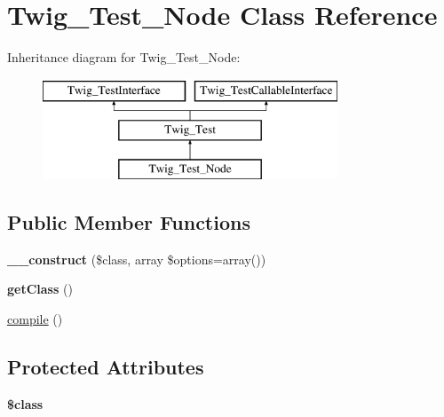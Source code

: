 \hypertarget{class_twig___test___node}{}\section{Twig\+\_\+\+Test\+\_\+\+Node Class Reference}
\label{class_twig___test___node}
Inheritance diagram for Twig\+\_\+\+Test\+\_\+\+Node\+:\begin{figure}[H]
\begin{center}
\leavevmode
\includegraphics[height=3.000000cm]{class_twig___test___node}
\end{center}
\end{figure}
\subsection*{Public Member Functions}
\begin{DoxyCompactItemize}
\item 
\hypertarget{class_twig___test___node_ad54af67e0f4e88a0c80d60b51380a48e}{}{\bfseries \+\_\+\+\_\+construct} (\$class, array \$options=array())\label{class_twig___test___node_ad54af67e0f4e88a0c80d60b51380a48e}

\item 
\hypertarget{class_twig___test___node_a23ecbde357f7f6bde5a50f876334a74d}{}{\bfseries get\+Class} ()\label{class_twig___test___node_a23ecbde357f7f6bde5a50f876334a74d}

\item 
\hyperlink{class_twig___test___node_a3815e7c2e73f00c2ebffcf5b90eef3b1}{compile} ()
\end{DoxyCompactItemize}
\subsection*{Protected Attributes}
\begin{DoxyCompactItemize}
\item 
\hypertarget{class_twig___test___node_a252ba022809910ea710a068fc1bab657}{}{\bfseries \$class}\label{class_twig___test___node_a252ba022809910ea710a068fc1bab657}

\end{DoxyCompactItemize}


